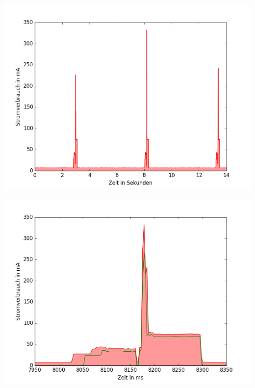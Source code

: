 \documentclass[18pt]{beamer}
\begin{document}
\begin{frame}
	\begin{minipage}[c][\textheight][c]{\textwidth}
		\centering
		\includegraphics[height=0.95\textheight]{plots/probereqfull.png}
	\end{minipage}
\end{frame}

\begin{frame}
	\begin{minipage}[c][\textheight][c]{\textwidth}
		\centering
		\includegraphics[height=0.95\textheight]{plots/probereqv.png}
	\end{minipage}
\end{frame}
\end{document}

